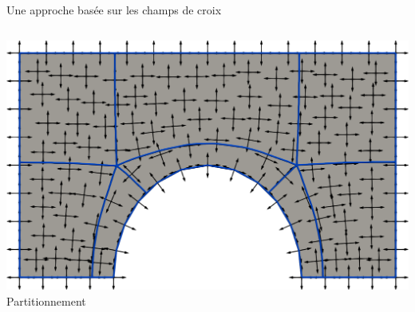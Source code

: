 \documentclass[compress,10pt,aspectratio=169]{beamer}
\begin{document}
\begin{frame}{Une approche basée sur les champs de croix}
\begin{columns}
\begin{column}{0.25\textwidth}
\centering
\includegraphics[scale=0.068]{images/frey_5.pdf}\hspace{0.2cm}
\footnotesize Partitionnement
\end{column}


\end{columns}

\vspace{0.4cm}


\end{frame}
\end{document}

